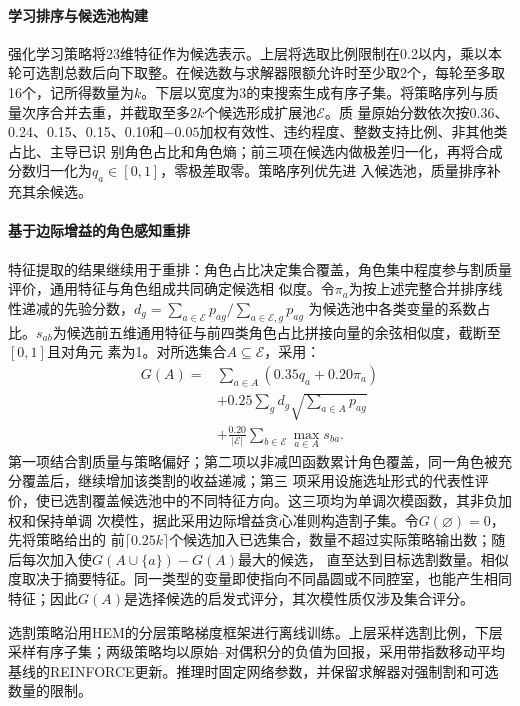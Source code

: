 \documentclass[preprint,12pt,nonatbib]{elsarticle}
\begin{document}
\paragraph{学习排序与候选池构建}
强化学习策略将23维特征作为候选表示。上层将选取比例限制在0.2以内，乘以本轮可选割总数后向下取整。在候选数与求解器限额允许时至少取2个，每轮至多取16个，记所得数量为$k$。下层以宽度为3的束搜索生成有序子集。将策略序列与质量次序合并去重，并截取至多$2k$个候选形成扩展池$\mathcal E$。质
量原始分数依次按0.36、0.24、0.15、0.15、0.10和$-0.05$加权有效性、违约程度、整数支持比例、非其他类占比、主导已识
别角色占比和角色熵；前三项在候选内做极差归一化，再将合成分数归一化为$q_a\in[0,1]$，零极差取零。策略序列优先进
入候选池，质量排序补充其余候选。

\paragraph{基于边际增益的角色感知重排}
特征提取的结果继续用于重排：角色占比决定集合覆盖，角色集中程度参与割质量评价，通用特征与角色组成共同确定候选相
似度。令$\pi_a$为按上述完整合并排序线性递减的先验分数，$d_g=\sum_{a\in\mathcal E}p_{ag}/\sum_{a\in\mathcal E,g}p_{ag}$
为候选池中各类变量的系数占比。$s_{ab}$为候选前五维通用特征与前四类角色占比拼接向量的余弦相似度，截断至$[0,1]$且对角元
素为1。对所选集合$A\subseteq\mathcal E$，采用：
\begin{equation}
\begin{aligned}
G(A)={}&\sum_{a\in A}(0.35q_a+0.20\pi_a)\\
&+0.25\sum_gd_g\sqrt{\sum_{a\in A}p_{ag}}\\
&+\frac{0.20}{|\mathcal E|}\sum_{b\in\mathcal E}\max_{a\in A}s_{ba}.
\end{aligned}
\label{eq:cut-rerank-cn}
\end{equation}
第一项结合割质量与策略偏好；第二项以非减凹函数累计角色覆盖，同一角色被充分覆盖后，继续增加该类割的收益递减；第三
项采用设施选址形式的代表性评价，使已选割覆盖候选池中的不同特征方向。这三项均为单调次模函数，其非负加权和保持单调
次模性\citep{krause2014submodular}，据此采用边际增益贪心准则构造割子集。令$G(\varnothing)=0$，先将策略给出的
前$\lceil0.25k\rceil$个候选加入已选集合，数量不超过实际策略输出数；随后每次加入使$G(A\cup\{a\})-G(A)$最大的候选，
直至达到目标选割数量。相似度取决于摘要特征。同一类型的变量即使指向不同晶圆或不同腔室，也能产生相同特征；因此$G(A)$是选择候选的启发式评分，其次模性质仅涉及集合评分。

选割策略沿用HEM的分层策略梯度框架进行离线训练\citep{wang2023hem}。上层采样选割比例，下层采样有序子集；两级策略均以原始--对偶积分的负值为回报，采用带指数移动平均基线的REINFORCE更新。推理时固定网络参数，并保留求解器对强制割和可选数量的限制。
\end{document}
